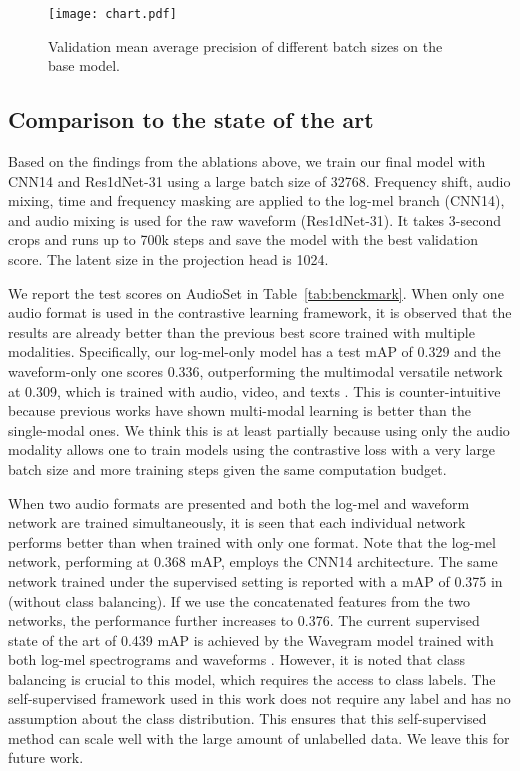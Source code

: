 \documentclass{article}
\begin{document}
\begin{figure}[ht]
  \centering
  \texttt{[image: chart.pdf]}
  \caption{Validation mean average precision of different batch sizes on the base model.}
  \label{fig:batch_size}
\end{figure}

\subsection{Comparison to the state of the art}

Based on the findings from the ablations above, we train our final model with CNN14 and Res1dNet-31 using a large batch size of 32768. Frequency shift, audio mixing, time and frequency masking are applied to the log-mel branch (CNN14), and audio mixing is used for the raw waveform (Res1dNet-31). It takes 3-second crops and runs up to 700k steps and save the model with the best validation score. The latent size in the projection head is 1024.

We report the test scores on AudioSet in Table~\ref{tab:benckmark}. When only one audio format is used in the contrastive learning framework, it is observed that the results are already better than the previous best score trained with multiple modalities. Specifically, our log-mel-only model has a test mAP of 0.329 and the waveform-only one scores 0.336, outperforming the multimodal versatile network at 0.309, which is trained with audio, video, and texts \cite{alayrac2020self}. This is counter-intuitive because previous works have shown multi-modal learning is better than the single-modal ones. We think this is at least partially because using only the audio modality allows one to train models using the contrastive loss with a very large batch size and more training steps given the same computation budget.

When two audio formats are presented and both the log-mel and waveform network are trained simultaneously, it is seen that each individual network performs better than when trained with only one format. Note that the log-mel network, performing at 0.368 mAP, employs the CNN14 architecture. The same network trained under the supervised setting is reported with a mAP of 0.375 in \cite{kong2020panns} (without class balancing). If we use the  concatenated features from the two networks, the performance further increases to 0.376. The current supervised state of the art of 0.439 mAP is achieved by the Wavegram model trained with both log-mel spectrograms and waveforms \cite{kong2020panns}. However, it is noted that class balancing is crucial to this model, which requires the access to class labels. The self-supervised framework used in this work does not require any label and has no assumption about the class distribution. This ensures that this self-supervised method can scale well with the large amount of unlabelled data. We leave this for future work.
\end{document}
